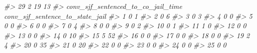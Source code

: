 \documentclass[
]{krantz}
\makeatletter
\newenvironment{Shaded}{\begin{snugshade}}{\end{snugshade}}
\newcommand{\CommentTok}[1]{\textcolor[rgb]{0.37,0.37,0.37}{\textit{#1}}}
\newenvironment{kframe}{%
\medskip{}
\setlength{\fboxsep}{.8em}
 \def\at@end@of@kframe{}%
 \ifinner\ifhmode%
  \def\at@end@of@kframe{\end{minipage}}%
  \begin{minipage}{\columnwidth}%
 \fi\fi%
 \def\FrameCommand##1{\hskip\@totalleftmargin \hskip-\fboxsep
 \colorbox{shadecolor}{##1}\hskip-\fboxsep
     \hskip-\linewidth \hskip-\@totalleftmargin \hskip\columnwidth}%
 \MakeFramed {\advance\hsize-\width
   \@totalleftmargin\z@ \linewidth\hsize
   \@setminipage}}%
 {\par\unskip\endMakeFramed%
 \at@end@of@kframe}
\renewenvironment{Shaded}{\begin{kframe}}{\end{kframe}}
\makeatother
\begin{document}
\begin{Shaded}
\begin{Highlighting}[]
\CommentTok{\#\textgreater{} 29              2      19           13}
\CommentTok{\#\textgreater{}    conv\_sjf\_sentenced\_to\_co\_jail\_time conv\_sjf\_sentence\_to\_state\_jail}
\CommentTok{\#\textgreater{} 1                                   0                               1}
\CommentTok{\#\textgreater{} 2                                   0                               6}
\CommentTok{\#\textgreater{} 3                                   0                               3}
\CommentTok{\#\textgreater{} 4                                   0                               0}
\CommentTok{\#\textgreater{} 5                                   0                               0}
\CommentTok{\#\textgreater{} 6                                   0                               0}
\CommentTok{\#\textgreater{} 7                                   0                               4}
\CommentTok{\#\textgreater{} 8                                   0                               0}
\CommentTok{\#\textgreater{} 9                                   0                               2}
\CommentTok{\#\textgreater{} 10                                  0                               1}
\CommentTok{\#\textgreater{} 11                                  1                               0}
\CommentTok{\#\textgreater{} 12                                  0                               0}
\CommentTok{\#\textgreater{} 13                                  0                               0}
\CommentTok{\#\textgreater{} 14                                  0                              10}
\CommentTok{\#\textgreater{} 15                                  5                              52}
\CommentTok{\#\textgreater{} 16                                  0                               0}
\CommentTok{\#\textgreater{} 17                                  0                               0}
\CommentTok{\#\textgreater{} 18                                  0                               0}
\CommentTok{\#\textgreater{} 19                                  2                               4}
\CommentTok{\#\textgreater{} 20                                  0                              35}
\CommentTok{\#\textgreater{} 21                                  0                              20}
\CommentTok{\#\textgreater{} 22                                  0                               0}
\CommentTok{\#\textgreater{} 23                                  0                               0}
\CommentTok{\#\textgreater{} 24                                  0                               0}
\CommentTok{\#\textgreater{} 25                                  0                               0}

\end{Highlighting}
\end{Shaded}
\end{document}
